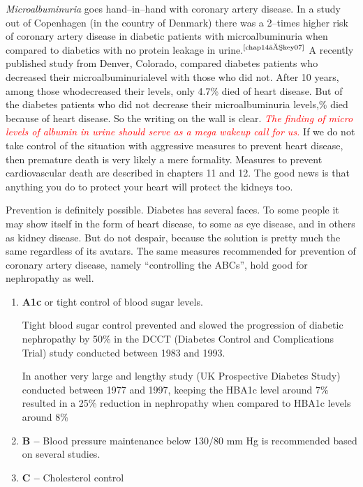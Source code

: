 \textit{Microalbuminuria} goes hand–in–hand with coronary artery disease. In a study out of Copenhagen (in the country of Denmark) there was a 2–times higher risk of coronary artery disease in diabetic patients with microalbuminuria when compared to diabetics with no protein lea\-kage in urine.$^{\text{\cite{chap14–key07}}}$ A recently published study from Denver, Colorado, compared diabetes patients who decreased their microalbuminuria\break level with those who did not. After 10 years, among those who\break decreased their levels, only 4.7\% died of heart disease. But of the dia\-betes patients who did not decrease their microalbuminuria levels,\% died because of heart disease. So the writing on the wall is clear. \textcolor{red}{\textit{The finding of micro levels of albumin in urine should serve as a mega wakeup call for us.}} If we do not take control of the situation with aggressive measures to prevent heart disease, then premature death is very likely a mere formality. Measures to prevent cardiovascular death are des\-cribed in chapters 11 and 12. The good news is that anything you do to protect your heart will protect the kidneys too.


Prevention is definitely possible. Diabetes has several faces. To some people it may show itself in the form of heart disease, to some as eye disease, and in others as kidney disease. But do not despair, because the solution is pretty much the same regardless of its avatars. The same measures recommended for prevention of coronary artery disease, namely “controlling the ABCs”, hold good for nephropathy as well.

\begin{enumerate}[\ding{118}]
\itemsep=0pt
\item \textbf{A1c} or tight control of blood sugar levels.

Tight blood sugar control prevented and slowed the progression of diabetic nephropathy by 50\% in the DCCT (Diabetes Control and Complications Trial) study conducted between 1983 and 1993.

In another very large and lengthy study (UK Prospective Diabetes Study) conducted between 1977 and 1997, keeping the HBA1c level around 7\% resulted in a 25\% reduction in nephropathy when compared to HBA1c levels around 8\%
\item \textbf{B –} Blood pressure maintenance below 130/80 mm Hg is recomme\-nded based on several studies.
\item \textbf{C –} Cholesterol control
\end{enumerate}

